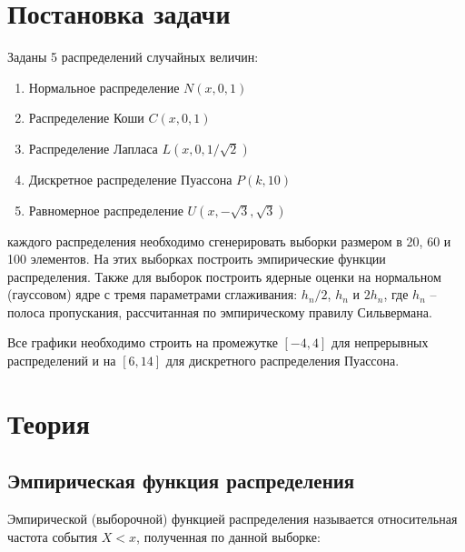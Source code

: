 \documentclass[12pt]{article}
\begin{document}
\begin{flushleft}

\setlength{\parindent}{1cm}

\tableofcontents

\newpage

\listoffigures

\newpage

\section{Постановка задачи}
    
	Заданы 5 распределений случайных величин:

	\begin{enumerate}
		\item Нормальное распределение $N(x, 0, 1)$
		\item Распределение Коши $C(x, 0, 1)$
		\item Распределение Лапласа $L(x, 0, 1/\sqrt{2})$
		\item Дискретное распределение Пуассона $P(k, 10)$
		\item Равномерное распределение $U(x, -\sqrt{3}, \sqrt{3})$
	\end{enumerate}

     каждого распределения необходимо сгенерировать выборки размером в 20, 60 и 100 элементов. На этих выборках построить эмпирические функции распределения. Также для выборок построить ядерные оценки на нормальном (гауссовом) ядре с тремя параметрами сглаживания: $h_n / 2$, $h_n$ и $2h_n$, где $h_n$ -- полоса пропускания, рассчитанная по эмпирическому правилу Сильвермана.
    
    Все графики необходимо строить на промежутке $[-4, 4]$ для непрерывных распределений и на $[6, 14]$ для дискретного распределения Пуассона.

\newpage

\section{Теория}

    \subsection{Эмпирическая функция распределения}

        Эмпирической (выборочной) функцией распределения называется относительная частота события $X < x$, полученная по данной выборке:\cite{theory1}


\end{flushleft}
\end{document}
